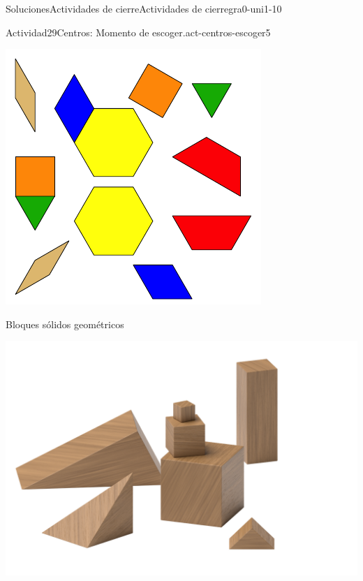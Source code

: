\documentclass[twoside,10pt,]{article}
\begin{document}
\begin{solutions-section}{Soluciones}{Actividades de cierre}{}{Actividades de cierre}{}{}{gra0-uni1-10}
\begin{activitysolution}{Actividad}{29}{Centros: Momento de escoger.}{act-centros-escoger5}
\begin{sidebyside}{2}{0.025}{0.025}{0.05}
\begin{sbspanel}{0.45}
\includegraphics[width=\linewidth]{external/svg-source/tikz-file-147344.pdf}
\end{sbspanel}%
\end{sidebyside}%
\begin{sidebyside}{2}{0.025}{0.025}{0.05}%
\begin{sbspanel}{0.45}%
Bloques sólidos geométricos%
\par
\includegraphics[width=\linewidth]{external/png-source/K.1.A Beta Student Workbook.Geoblocks.png}
\end{sbspanel}%

\end{sidebyside}
\end{activitysolution}
\end{solutions-section}
\end{document}
